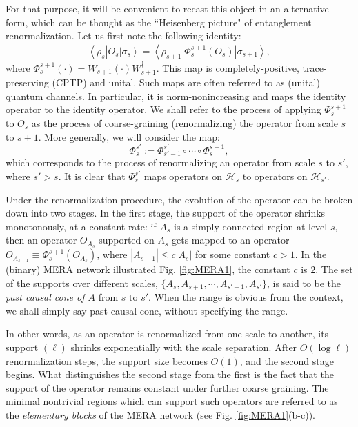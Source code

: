 \documentclass[a4paper,11pt]{article}
\newcommand{\bra}[1]{\left\langle #1 \right|}
\newcommand{\ket}[1]{\left|#1\right\rangle}
\newcommand{\1}{\mathbbm{1}}
\newcommand{\cH}{\mathcal{H}}
\begin{document}
For that purpose, it will be convenient to recast this object in an alternative form, which can be thought as the ``Heisenberg picture" of entanglement renormalization.
Let us first note the following identity:
\begin{equation}
	\bra{\rho_s} O_s \ket{\sigma_s} = \bra{\rho_{s+1}} \Phi_s^{s+1}(O_s)\ket{\sigma_{s+1}},
\end{equation}
where $\Phi_s^{s+1}(\cdot) = W_{s+1}(\cdot) W_{s+1}^{\dagger}$. This map is completely-positive, trace-preserving (CPTP) and unital. Such maps are often referred to as (unital) quantum channels.  In particular, it is norm-nonincreasing
and maps the identity operator to the identity operator. We shall refer to the process of applying $\Phi_s^{s+1}$ to $O_s$ as the process of coarse-graining (renormalizing)  the operator from scale
$s$ to $s+1$. More generally, we will consider the map:
\begin{equation}
	\Phi_s^{s'} := \Phi_{s'-1}^{s'}\circ \cdots \circ \Phi_s^{s+1},
\end{equation}
which corresponds to the process of renormalizing an operator from scale $s$ to $s'$, where $s'>s$. It is clear that $\Phi_s^{s'}$ maps operators on $\cH_{s}$ to operators on $\cH_{s'}$.

Under the renormalization procedure, the evolution of the operator can be broken down into two stages. In the first stage, the support of the operator shrinks monotonously, at a constant rate: if $A_s$ is a simply connected region at level $s$, then an operator $O_{A_s}$ supported on $A_s$ gets mapped to an operator $O_{A_{s+1}}\equiv \Phi_s^{s+1}(O_{A_s})$, where $|A_{s+1}|\leq c|A_s|$ for some constant $c>1$. In the (binary) MERA network illustrated Fig. \ref{fig:MERA1}, the constant $c$ is $2$.
The set of the supports over different scales, $\{A_s,A_{s+1},\cdots, A_{s'-1},A_{s'} \}$, is said to be the \emph{past causal cone of $A$} from $s$ to $s'$. When the range is obvious from the
context, we shall simply say past causal cone, without specifying the range.

In other words, as an operator is renormalized from one scale to another, its support $(\ell)$ shrinks exponentially with the scale separation. After $O(\log \ell)$ renormalization steps,  the support size becomes $O(1)$, and the second stage begins. What distinguishes the second stage from the first is the fact that the support of the operator remains
 constant under further coarse graining. The minimal nontrivial regions which can support such operators are referred to as the \emph{elementary blocks} of the MERA network (see Fig. \ref{fig:MERA1}(b-c)).
\end{document}
